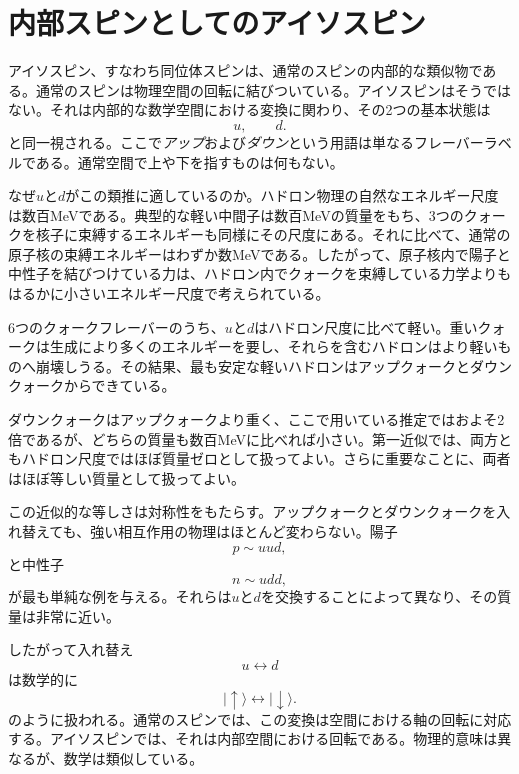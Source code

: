 \section{内部スピンとしてのアイソスピン}

アイソスピン、すなわち同位体スピンは、通常のスピンの内部的な類似物である。通常のスピンは物理空間の回転に結びついている。アイソスピンはそうではない。それは内部的な数学空間における変換に関わり、その2つの基本状態は
\begin{equation}
u,\qquad d.
\end{equation}
と同一視される。ここで\emph{アップ}および\emph{ダウン}という用語は単なるフレーバーラベルである。通常空間で上や下を指すものは何もない。


なぜ\(u\)と\(d\)がこの類推に適しているのか。ハドロン物理の自然なエネルギー尺度は数百MeVである。典型的な軽い中間子は数百MeVの質量をもち、3つのクォークを核子に束縛するエネルギーも同様にその尺度にある。それに比べて、通常の原子核の束縛エネルギーはわずか数MeVである。したがって、原子核内で陽子と中性子を結びつけている力は、ハドロン内でクォークを束縛している力学よりもはるかに小さいエネルギー尺度で考えられている。

6つのクォークフレーバーのうち、\(u\)と\(d\)はハドロン尺度に比べて軽い。重いクォークは生成により多くのエネルギーを要し、それらを含むハドロンはより軽いものへ崩壊しうる。その結果、最も安定な軽いハドロンはアップクォークとダウンクォークからできている。

ダウンクォークはアップクォークより重く、ここで用いている推定ではおよそ2倍であるが、どちらの質量も数百MeVに比べれば小さい。第一近似では、両方ともハドロン尺度ではほぼ質量ゼロとして扱ってよい。さらに重要なことに、両者はほぼ等しい質量として扱ってよい。

この近似的な等しさは対称性をもたらす。アップクォークとダウンクォークを入れ替えても、強い相互作用の物理はほとんど変わらない。陽子
\begin{equation}
p\sim uud,
\end{equation}
と中性子
\begin{equation}
n\sim udd,
\end{equation}
が最も単純な例を与える。それらは\(u\)と\(d\)を交換することによって異なり、その質量は非常に近い。

したがって入れ替え
\begin{equation}
u\longleftrightarrow d
\end{equation}
は数学的に
\begin{equation}
|\uparrow\rangle\longleftrightarrow|\downarrow\rangle.
\end{equation}
のように扱われる。通常のスピンでは、この変換は空間における軸の回転に対応する。アイソスピンでは、それは内部空間における回転である。物理的意味は異なるが、数学は類似している。

